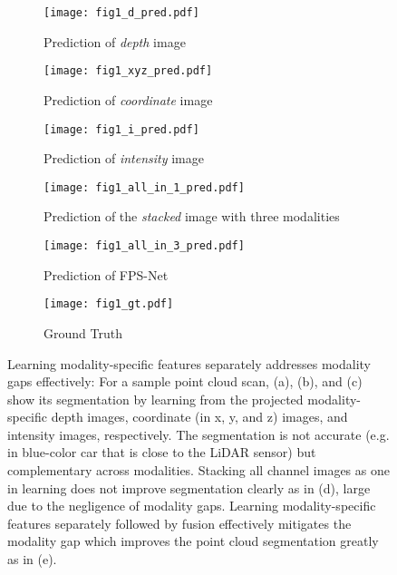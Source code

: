 \documentclass[preprint,review,3p]{elsarticle}
\begin{document}
\begin{figure}[!h]
  \centering
  
  \begin{subfigure}[b]{\textwidth}
  \centering
  \texttt{[image: fig1\_d\_pred.pdf]}
  \caption{Prediction of \textit{depth} image}
  \end{subfigure}

  \begin{subfigure}[b]{\textwidth}
  \centering
  \texttt{[image: fig1\_xyz\_pred.pdf]}
  \caption{Prediction of \textit{coordinate} image}
  \end{subfigure}
  
  \begin{subfigure}[b]{\textwidth}
  \centering
  \texttt{[image: fig1\_i\_pred.pdf]}
  \caption{Prediction of \textit{intensity} image}
  \end{subfigure}
  
  \begin{subfigure}[b]{\textwidth}
  \centering
  \texttt{[image: fig1\_all\_in\_1\_pred.pdf]}
  \caption{Prediction of the \textit{stacked} image with three modalities}
  \end{subfigure}
  
  \begin{subfigure}[b]{\textwidth}
  \centering
  \texttt{[image: fig1\_all\_in\_3\_pred.pdf]}
  \caption{Prediction of FPS-Net}
  \end{subfigure}

  \begin{subfigure}[b]{\textwidth}
  \centering
  \texttt{[image: fig1\_gt.pdf]}
  \caption{Ground Truth}
  \end{subfigure}
  
  \caption{Learning modality-specific features separately addresses modality gaps effectively: For a sample point cloud scan, (a), (b), and (c) show its segmentation by learning from the projected modality-specific depth images, coordinate (in x, y, and z) images, and intensity images, respectively. The segmentation is not accurate (e.g. in blue-color car that is close to the LiDAR sensor) but complementary across modalities. Stacking all channel images as one in learning does not improve segmentation clearly as in (d), large due to the negligence of modality gaps. Learning modality-specific features separately followed by fusion effectively mitigates the modality gap which improves the point cloud segmentation greatly as in (e).}
  \label{fig.PredCompare}
\end{figure}
  
\end{document}
